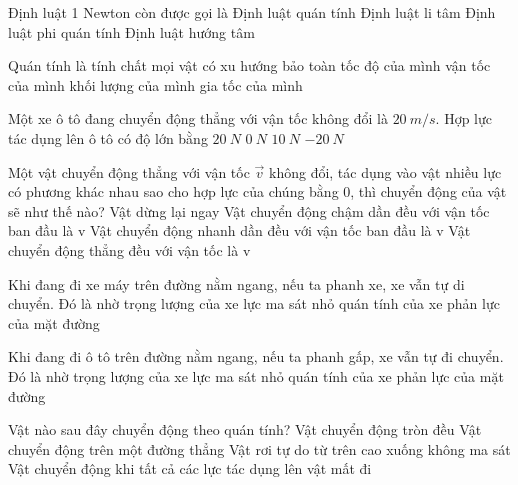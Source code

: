 \begin{ex}%
Định luật 1 Newton còn được gọi là
\choice
{\True Định luật quán tính}
{Định luật li tâm}
{Định luật phi quán tính}
{Định luật hướng tâm}
\loigiai{
}  \end{ex}
\begin{ex}%
Quán tính là tính chất mọi vật có xu hướng bảo toàn
\choice
{tốc độ của mình}
{\True vận tốc của mình}
{khối lượng của mình}
{gia tốc của mình}
  \end{ex}
\begin{ex}%
Một xe ô tô đang chuyển động thẳng với vận tốc không đổi là $20\ m/s$. Hợp lực tác dụng lên ô tô có độ lớn bằng
\choice
{$20\ N$}
{\True $0\ N$}
{$10\ N$}
{$-20\ N$}
  \end{ex}
\begin{ex}%
Một vật chuyển động thẳng với vận tốc $\vec v$ không đổi, tác dụng vào vật nhiều lực có phương khác nhau sao cho hợp lực của chúng bằng 0, thì chuyển động của vật sẽ như thế nào?
\choice
{Vật dừng lại ngay}
{Vật chuyển động chậm dần đều với vận tốc ban đầu là v}
{Vật chuyển động nhanh dần đều với vận tốc ban đầu là v}
{\True Vật chuyển động thẳng đều với vận tốc là v}
 \end{ex}
\begin{ex}%
Khi đang đi xe máy trên đường nằm ngang, nếu ta phanh xe, xe vẫn tự di chuyển. Đó là nhờ
\choice
{trọng lượng của xe}
{lực ma sát nhỏ}
{\True quán tính của xe}
{phản lực của mặt đường}
\end{ex}
\begin{ex}%
Khi đang đi ô tô trên đường nằm ngang, nếu ta phanh gấp, xe vẫn tự đi chuyển. Đó là nhờ
\choice
{trọng lượng của xe}
{lực ma sát nhỏ}
{\True quán tính của xe}
{phản lực của mặt đường}
  \end{ex}
\begin{ex}%
Vật nào sau đây chuyển động theo quán tính?
\choice
{Vật chuyển động tròn đều}
{Vật chuyển động trên một đường thẳng}
{Vật rơi tự do từ trên cao xuống không ma sát}
{\True Vật chuyển động khi tất cả các lực tác dụng lên vật mất đi}
  \end{ex}
